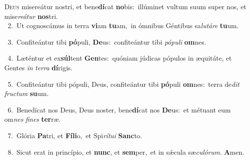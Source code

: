 \lettrine{\initial\textcolor{\initialcolor}{D}}{eus} misereátur nostri, et bene\-\textbf{dí}\-cat \textbf{no}\-bis:~\star illúminet vultum suum super nos, et mise\-\textit{re}\-\textit{á}\textit{tur} \textbf{nos}\-tri.\\
{\numbfont\textcolor{\numbcolor}{~2.}}~Ut cognoscámus in terra \textbf{vi}\-am \textbf{tu}\-am,~\star in ómnibus Géntibus sa\-\textit{lu}\-\textit{tá}\textit{re} \textbf{tu}\-um.\par
{\numbfont\textcolor{\numbcolor}{~3.}}~Confiteántur tibi \textbf{pó}\-puli, \textbf{De}\-us:~\star confiteántur tibi \textit{pó}\-\textit{pu}\textit{li} \textbf{om}\-nes.\par
{\numbfont\textcolor{\numbcolor}{~4.}}~Læténtur et ex\-\textbf{súl}\-tent \textbf{Gen}\-tes:~\star quóniam júdicas pópulos in æquitáte, et Gentes \textit{in} \textit{ter}\-\textit{ra} \textbf{dí}\-rigis.\par
{\numbfont\textcolor{\numbcolor}{~5.}}~Confiteántur tibi pópuli, Deus, confiteántur tibi \textbf{pó}\-puli \textbf{om}\-nes:~\star terra de\textit{dit} \textit{fruc}\-\textit{tum} \textbf{su}\-um.\par
{\numbfont\textcolor{\numbcolor}{~6.}}~Benedícat nos Deus, Deus noster, bene\-\textbf{dí}\-cat nos \textbf{De}\-us:~\star et métuant eum om\textit{nes} \textit{fi}\-\textit{nes} \textbf{ter}\-ræ.\par
{\numbfont\textcolor{\numbcolor}{~7.}}~Glória \textbf{Pa}\-tri, et \textbf{Fí}\-\textbf{li}o,~\star et Spi\-\textit{rí}\-\textit{tu}\textit{i} \textbf{Sanc}\-to.\par
{\numbfont\textcolor{\numbcolor}{~8.}}~Sicut erat in princípio, et \textbf{nunc}\-, et \textbf{sem}\-per,~\star et in sǽcula sæ\-\textit{cu}\-\textit{ló}\textit{rum}. \textbf{A}\-men.\par
